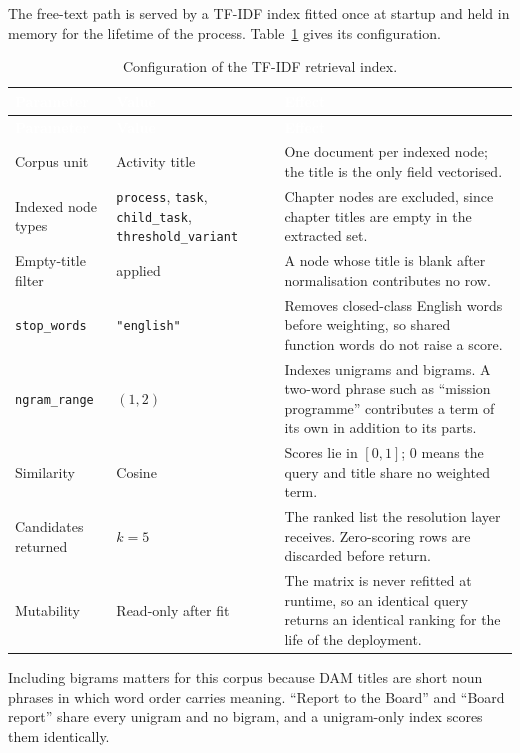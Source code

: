 The free-text path is served by a TF-IDF index\citep{salton1988,manning2008ir} fitted once at
startup and held in memory for the lifetime of the process. Table~\ref{tab:indexparams} gives
its configuration.

\begin{longtable}{|p{}|p{}|p{}|}
\caption{Configuration of the TF-IDF retrieval index.}\label{tab:indexparams}\\
\hline
\rowcolor{myblue}\textcolor{white}{\textbf{Parameter}} & \textcolor{white}{\textbf{Value}} & \textcolor{white}{\textbf{Effect}} \\
\hline
\endfirsthead
\hline
\rowcolor{myblue}\textcolor{white}{\textbf{Parameter}} & \textcolor{white}{\textbf{Value}} & \textcolor{white}{\textbf{Effect}} \\
\hline
\endhead
Corpus unit & Activity title & One document per indexed node; the title is the only field vectorised. \\ \hline
Indexed node types & \texttt{process}, \texttt{task}, \texttt{child\_task}, \texttt{threshold\_variant} & Chapter nodes are excluded, since chapter titles are empty in the extracted set. \\ \hline
Empty-title filter & applied & A node whose title is blank after normalisation contributes no row. \\ \hline
\texttt{stop\_words} & \texttt{"english"} & Removes closed-class English words before weighting, so shared function words do not raise a score. \\ \hline
\texttt{ngram\_range} & $(1,2)$ & Indexes unigrams and bigrams. A two-word phrase such as ``mission programme'' contributes a term of its own in addition to its parts. \\ \hline
Similarity & Cosine & Scores lie in $[0,1]$; $0$ means the query and title share no weighted term. \\ \hline
Candidates returned & $k = 5$ & The ranked list the resolution layer receives. Zero-scoring rows are discarded before return. \\ \hline
Mutability & Read-only after fit & The matrix is never refitted at runtime, so an identical query returns an identical ranking for the life of the deployment. \\ \hline
\end{longtable}

Including bigrams matters for this corpus because DAM titles are short noun phrases in which
word order carries meaning. ``Report to the Board'' and ``Board report'' share every unigram
and no bigram, and a unigram-only index scores them identically.


